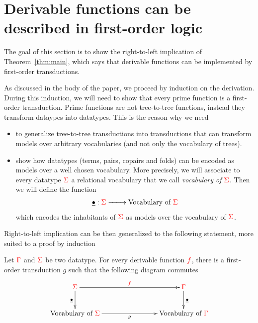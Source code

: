 
\section{Derivable functions can be described in first-order logic}
\label{sec:to-logic}
The goal of this section is to show the right-to-left implication of Theorem~\ref{thm:main}, which says that derivable functions can be implemented by first-order transductions. 

As discussed in the body of the paper, we proceed by induction on the derivation. During this induction, we will need to show that every prime function is a first-order transduction. Prime functions are not tree-to-tree functions, instead they transform dataypes into datatypes. This is the reason why we need 
\begin{itemize}
\item to generalize tree-to-tree transductions into  transductions that can transform models over arbitrary vocabularies (and not only the vocabulary of trees). 
\item show how datatypes (terms, pairs, copairs and folds) can be encoded as models over a well chosen vocabulary. More precisely, we will associate to every datatype ${\color{red}{\Sigma}}$ a relational vocabulary that we call \emph{vocabulary of ${\color{red}{\Sigma}}$}. Then we will define the function
\begin{align*}
\underline{\bullet}: {\color{red}{\Sigma}} \xrightarrow{\qquad} \text{Vocabulary of ${\color{red}{\Sigma}}$}
\end{align*} 
which encodes the inhabitants of ${\color{red}{\Sigma}}$ as models over the vocabulary of ${\color{red}{\Sigma}}$.
\end{itemize}
 
 Right-to-left implication can be then generalized to the following statement, more suited to a proof by induction

\begin{proposition}\label{prop:main-right-to-left}
Let ${\color{red}{\Gamma}}$ and ${\color{red}{\Sigma}}$ be two datatype.  For every derivable function ${\color{red}{f}}$, there is a first-order transduction $g$ such that the following diagram commutes
  \begin{align*}
  \xymatrix@C=2.8cm{
          \rSigma 
        \ar[d]_{\substack{\underline{\bullet}}}
        \ar[r]^-{\ranked{f}}
        &
    \rGamma \ar[d]^{\substack{\underline{\bullet}}}
        \\
      \text{Vocabulary of $\rSigma$}
        \ar[r]_-{g}
        &
    \text{Vocabulary of $\rGamma$}   
    } 
\end{align*}  
\end{proposition}

